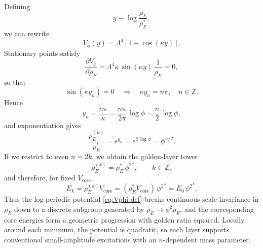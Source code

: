 \documentclass[10pt,reprint,aps,onecolumn,nofootinbib]{revtex4-2}
\newcommand{\rhoE}{\rho_{\!E}}                           %
\newcommand{\Golden}{\phi}
\newcommand{\GoldenSq}{\phi^{2}}
\begin{document}
        Defining
        \begin{equation}
            y \equiv \log\frac{\rhoE}{\rhoE^{*}},
        \end{equation}
        we can rewrite
        \begin{equation}
            V_{\Golden}(y)
            = \Lambda^4\left[1 - \cos(\kappa y)\right].
        \end{equation}
        Stationary points satisfy
        \begin{equation}
            \frac{\partial V_{\Golden}}{\partial \rhoE}
            = \Lambda^4 \kappa \,\sin(\kappa y)\,\frac{1}{\rhoE}
            = 0,
        \end{equation}
        so that
        \begin{equation}
            \sin(\kappa y_n) = 0
            \quad\Longrightarrow\quad
            \kappa y_n = n\pi,\quad n\in\mathbb{Z}.
        \end{equation}
        Hence
        \begin{equation}
            y_n = \frac{n\pi}{\kappa}
            = \frac{n\pi}{2\pi}\,\log\Golden
            = \frac{n}{2}\,\log\Golden,
        \end{equation}
        and exponentiation gives
        \begin{equation}
            \frac{\rhoE^{(n)}}{\rhoE^{*}}
            = e^{y_n} = e^{\frac{n}{2}\log\Golden}
            = \Golden^{n/2}.
        \end{equation}
        If we restrict to even $n = 2k$, we obtain the golden-layer tower
        \begin{equation}
            \rhoE^{(k)} = \rhoE^{*}\,\GoldenSq^{\,k},
            \qquad
            k \in \mathbb{Z},
            \label{eq:golden-layers-rhoE}
        \end{equation}
        and therefore, for fixed $V_{\text{core}}$,
        \begin{equation}
            E_k = \rhoE^{(k)} V_{\text{core}}
            = (\rhoE^{*} V_{\text{core}})\,\GoldenSq^{\,k}
            = E_0\,\GoldenSq^{\,k}.
        \end{equation}
        Thus the log-periodic potential \eqref{eq:Vphi-def} breaks continuous
        scale invariance in $\rhoE$ down to a discrete subgroup generated by
        $\rhoE \rightarrow \GoldenSq \rhoE$, and the corresponding core
        energies form a geometric progression with golden ratio squared.
        Locally around each minimum, the potential is quadratic, so each layer
        supports conventional small-amplitude excitations with an $n$-dependent
        mass parameter.
\end{document}
